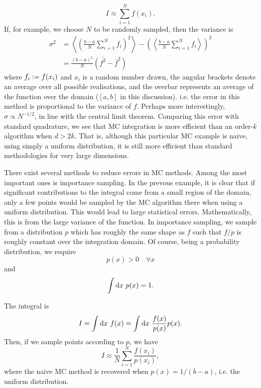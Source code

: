 \begin{equation}
    I\approx \sum_{i=1}^N f(x_i).
\end{equation}
If, for example, we choose $N$ to be randomly sampled, then the variance is
\begin{align}
    \sigma^2 &= \left\langle \left( \frac{b-a}{N}\sum^N_{i=1}f_i\right)^2\right\rangle - \left( \left\langle  \frac{b-a}{N}\sum^N_{i=1}f_i\right\rangle\right)^2 \\
    &= \frac{(b-a)^2}{N}(\bar{f^2} - \bar f^2)
\end{align}
where $f_i\mathrel{\mathop:}= f(x_i)$ and $x_i$ is a random number drawn, the angular brackets denote an average over all possible realisations, and the overbar represents an average of the function over the domain ($[a,b]$ in this discussion). i.e. the error in this method is proportional to the variance of $f$. Perhaps more interestingly, $\sigma\propto N^{-1/2}$, in line with the central limit theorem.\supercite{bernoulliJacobi1713} Comparing this error with standard quadrature, we see that MC integration is more efficient than an order-$k$ algorithm when $d>2k$. That is, although this particular \gls{MC} example is naive, using simply a uniform distribution, it is still more efficient than standard methodologies for very large dimensions.

There exist several methods to reduce errors in \gls{MC} methods.\supercite{jamesMonte1980} Among the most important ones is importance sampling.\supercite{kahnModification1959} In the prevous example, it is clear that if significant contributions to the integral come from a small region of the domain, only a few points would be sampled by the \gls{MC} algorithm there when using a uniform distribution. This would lead to large statistical errors. Mathematically, this is from the large variance of the function. In importance sampling, we sample from a distribution $p$ which has roughly the same shape as $f$ such that $f/p$ is roughly constant over the integration domain. Of course, being a probability distribution, we require
\begin{equation}
    p(x)>0 \quad \forall x
\end{equation}
and
\begin{equation}
    \int\mathrm{d} x \ p(x) = 1.
\end{equation}

The integral is
\begin{equation}
    I = \int\mathrm{d} x \  f(x) = \int\mathrm{d} x\ \frac{f(x)}{p(x)} p(x).
\end{equation}
Then, if we sample points according to $p$, we have
\begin{equation}
    I\approx \frac{1}{N}\sum^N_{i=1} \frac{f(x_i)}{p(x_i)},
\end{equation}
where the naive \gls{MC} method is recovered when $p(x)=1/(b-a)$, i.e. the uniform distribution.

